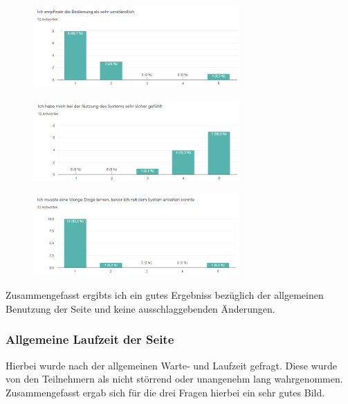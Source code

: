 \noChanges
\begin{figure}[H]
    \centering
    \includegraphics[width=0.7\textwidth]{media/survey/overelaboratedInterface.png}
\end{figure}

\noChanges
\begin{figure}[H]
    \centering
    \includegraphics[width=0.7\textwidth]{media/survey/safeUsage.png}
\end{figure}

\noChanges
\begin{figure}[H]
    \centering
    \includegraphics[width=0.7\textwidth]{media/survey/needToLearnUsage.png}
\end{figure}

\noChanges

Zusammengefasst ergibts ich ein gutes Ergebniss bezüglich der allgemeinen Benutzung der Seite und keine ausschlaggebenden Änderungen.
\subsubsection{Allgemeine Laufzeit der Seite}
Hierbei wurde nach der allgemeinen Warte- und Laufzeit gefragt. Diese wurde von den Teilnehmern als nicht störrend oder unangenehm lang wahrgenommen.
Zusammengefasst ergab sich für die drei Fragen hierbei ein sehr gutes Bild. 

